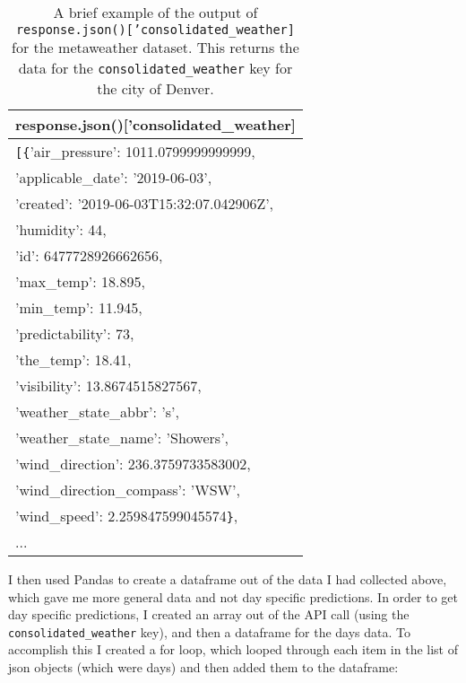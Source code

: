\documentclass[]{article}
\newcommand{\code}[1]{\colorbox{light-gray}{\texttt{#1}}}
\begin{document}
\begin{table}[!ht]
	\begin{center}
		\caption{A brief example of the output of \code{response.json()['consolidated\_weather]} for the metaweather dataset.  This returns the data for the \code{consolidated\_weather} key for the city of Denver.}
		\label{tab:table1}
		\begin{tabular}{|l|} 
			\hline
			\textbf{response.json()['consolidated\_weather]} \\
			\hline
			\verb|[{|'air\_pressure': 1011.0799999999999,\\
		'applicable\_date': '2019-06-03',\\
		'created': '2019-06-03T15:32:07.042906Z',\\
		'humidity': 44,\\
		'id': 6477728926662656,\\
		'max\_temp': 18.895,\\
		'min\_temp': 11.945,\\
		'predictability': 73,\\
		'the\_temp': 18.41,\\
		'visibility': 13.8674515827567,\\
		'weather\_state\_abbr': 's',\\
		'weather\_state\_name': 'Showers',\\
		'wind\_direction': 236.3759733583002,\\
		'wind\_direction\_compass': 'WSW',\\
		'wind\_speed': 2.259847599045574\verb|}|,\\
		...\\
			\hline
		\end{tabular}
	\end{center}
\end{table}

I then used Pandas to create a dataframe out of the data I had collected above, which gave me more general data and not day specific predictions.  In order to get day specific predictions, I created an array out of the API call (using the \code{consolidated\_weather} key), and then a dataframe for the days data.  To accomplish this I created a for loop, which looped through each item in the list of json objects (which were days) and then added them to the dataframe:
\end{document}
